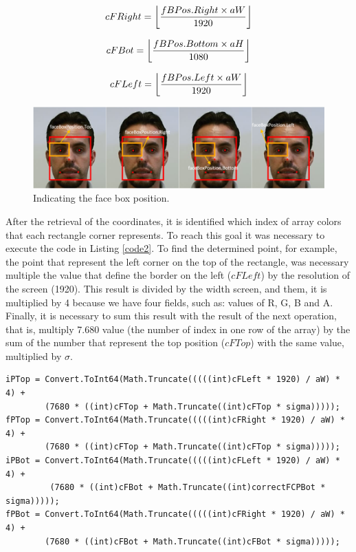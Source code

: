 \documentclass[10pt, conference]{IEEEtran}
\DeclarePairedDelimiter\floor{\lfloor}{\rfloor}
\begin{document}
    \begin{equation}
		cFRight=\floor*{\frac{fBPos.Right \times aW}{1920}}
	\end{equation}
    
    \begin{equation}
		cFBot=\floor*{\frac{fBPos.Bottom \times aH}{1080}}
	\end{equation}
    
    \begin{equation}
		cFLeft=\floor*{\frac{fBPos.Left \times aW}{1920}}
		\label{eq:pt4}
	\end{equation}


    \begin{figure}[t]
        \centering
        \includegraphics{figures/pic12.png}
        \caption{Indicating the face box position.}
        \label{fig:fig12}
    \end{figure}

	After the retrieval of the coordinates, it is identified which index of array colors that each rectangle corner represents.
	To reach this goal it was necessary to execute the code in Listing \ref{code2}. 
	To find the determined point, for example, the point that represent the left corner on the top of the rectangle, was necessary multiple the value that define the border on the left ($cFLeft$) by the resolution of the screen (1920). 
	This result is divided by the width screen, and them, it is multiplied by 4 because we have four fields, such as: values of R, G, B and A. 
	Finally, it is necessary to sum this result with the result of the next operation, that is, multiply 7.680 value (the number of index in one row of the array) by the sum of the number that represent the top position ($cFTop$) with the same value, multiplied by $\sigma$.
    
\begin{lstlisting}[caption = Calculate the array index that represent each corner of the rectangle., label={code2}, float=*]
iPTop = Convert.ToInt64(Math.Truncate(((((int)cFLeft * 1920) / aW) * 4) +
        (7680 * ((int)cFTop + Math.Truncate((int)cFTop * sigma)))));
fPTop = Convert.ToInt64(Math.Truncate(((((int)cFRight * 1920) / aW) * 4) +
        (7680 * ((int)cFTop + Math.Truncate((int)cFTop * sigma)))));
iPBot = Convert.ToInt64(Math.Truncate(((((int)cFLeft * 1920) / aW) * 4) + 
         (7680 * ((int)cFBot + Math.Truncate((int)correctFCPBot * sigma)))));
fPBot = Convert.ToInt64(Math.Truncate(((((int)cFRight * 1920) / aW) * 4) + 
        (7680 * ((int)cFBot + Math.Truncate((int)cFBot * sigma)))));
\end{lstlisting}
\end{document}
